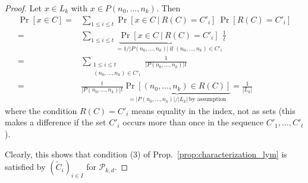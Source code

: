 \documentclass{scrartcl}
\theoremstyle{definition}
\begin{document}
\begin{proof}
    Let $x \in L_k$ with $x \in P(n_0, ..., n_k)$.
    Then
    \begin{align*}
        \Pr[x \in C] =& \sum_{1 \leq i \leq t} \Pr[x \in C \ | \ R(C) = C'_i] \ \Pr[R(C) = C'_i] \\
        =& \sum_{1 \leq i \leq t} \underbrace{\Pr[x \in C \ | \ R(C) = C'_i]}_{ = 1 / |P(n_0, ..., n_k)| \ \text{if $(n_0, ..., n_k) \in C'_i$}} \frac 1 t \\
        =& \sum_{\substack{1 \leq i \leq t\\(n_0, ..., n_k) \in C'_i}} \frac 1 {|P(n_0, ..., n_k)| t} \\
        =& \frac t {|P(n_0, ..., n_k)| t} \underbrace{\Pr[(n_0, ..., n_k) \in R(C)]}_{= |P(n_0, ..., n_k)| / |L_k| \ \text{by assumption}} = \frac 1 {|L_k|}
    \end{align*}
    where the condition $R(C) = C'_i$ means equality in the index, not as sets 
    (this makes a difference if the set $C'_i$ occurs more than once in the sequence $C'_1, ..., C'_t$).

    Clearly, this shows that condition (3) of Prop.~\ref{prop:characterization_lym} is satisfied by $(\tilde{C}_i)_{i \in I}$ for $\mathcal{P}_{k, d}$.
\end{proof}
\end{document}
